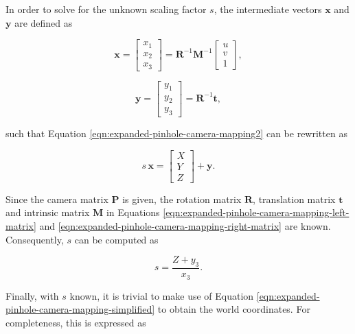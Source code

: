 In order to solve for the unknown scaling factor $s$, the intermediate vectors $\textbf{x}$ and $\textbf{y}$ are defined as

\begin{equation}
	\textbf{x}=
	\begin{bmatrix}
		x_1 \\ 
		x_2 \\ 
		x_3
	\end{bmatrix}
=
	\textbf{R}^{-1}\textbf{M}^{-1}
	\begin{bmatrix}
		u \\ 
		v \\ 
		1
	\end{bmatrix},
	\label{eqn:expanded-pinhole-camera-mapping-left-matrix}
\end{equation}

\begin{equation}
	\textbf{y}
	=
	\begin{bmatrix}
		y_1 \\ 
		y_2 \\ 
		y_3
	\end{bmatrix}
	=
	\textbf{R}^{-1}\textbf{t},
	\label{eqn:expanded-pinhole-camera-mapping-right-matrix}
\end{equation}

such that Equation \ref{eqn:expanded-pinhole-camera-mapping2} can be rewritten as

\begin{equation}
	s\,\textbf{x}=
	\begin{bmatrix}
		X \\ 
		Y \\ 
		Z
	\end{bmatrix}
	+\textbf{y}.
	\label{eqn:expanded-pinhole-camera-mapping-simplified}
\end{equation}

Since the camera matrix $\textbf{P}$ is given, the rotation matrix $\textbf{R}$, translation matrix $\textbf{t}$ and intrinsic matrix $\textbf{M}$ in Equations \ref{eqn:expanded-pinhole-camera-mapping-left-matrix} and \ref{eqn:expanded-pinhole-camera-mapping-right-matrix} are known. Consequently, $s$ can be computed as

\begin{equation}
	s=\frac{Z+y_3}{x_3}.
	\label{eqn:expanded-pinhole-camera-mapping-scaling-factor}
\end{equation}

Finally, with $s$ known, it is trivial to make use of Equation \ref{eqn:expanded-pinhole-camera-mapping-simplified} to obtain the world coordinates. For completeness, this is expressed as

